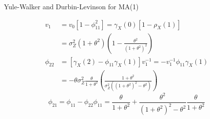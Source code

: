 \documentclass{article}
\begin{document}
\begin{multicols*}{3}
\begin{blackbox}{Yule-Walker and Durbin-Levinson for MA(1)}
\begin{enumerate}[label=\alph*), leftmargin=5pt]
    \begin{align*}
        v_1 &= v_0[1-\phi_{11}^2] = \gamma_X(0)[1-\rho_X(1)]\\
        &= \sigma_Z^2(1+\theta^2)\left(1-\frac{\theta^2}{(1+\theta^2)^2}\right)\\
        \phi_{22} &= [\gamma_X(2) - \phi_{11}\gamma_X(1)]v_1^{-1} = -v_1^{-1}\phi_{11}\gamma_X(1)\\
        &= -\theta\sigma_Z^2\frac{\theta}{1+\theta^2}\left(\frac{1+\theta^2}{\sigma_Z^2((1+\theta^2)^2-\theta^2)}\right)
    \end{align*}
    \[ \phi_{21} = \phi_{11} - \phi_{22}\phi_{11} =\frac{\theta}{1+\theta^2} + \frac{\theta^2}{(1+\theta^2)^2 - \theta^2} \frac{\theta}{1+\theta^2}
    \]
\end{enumerate}
\end{blackbox}


\end{multicols*}
\end{document}
